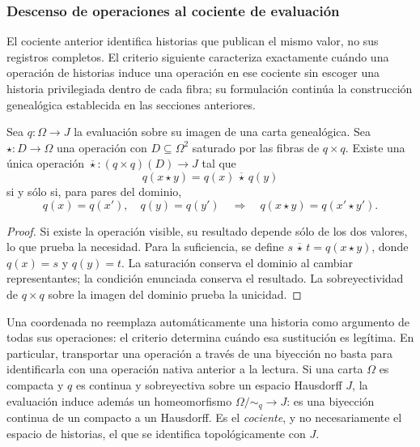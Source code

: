 \subsubsection{Descenso de operaciones al cociente de evaluación}
\label{sec:ch-descenso-fibras}

El cociente anterior identifica historias que publican el mismo valor, no
sus registros completos. El criterio siguiente caracteriza exactamente
cuándo una operación de historias induce una operación en ese cociente sin
escoger una historia privilegiada dentro de cada fibra; su formulación
continúa la construcción genealógica establecida en las secciones anteriores.

\begin{proposition}
\label{prop:ch-descenso-fibras}
Sea \(q:\Omega\to J\) la evaluación sobre su imagen de una carta
genealógica. Sea \(\star:D\to\Omega\) una operación con
\(D\subseteq\Omega^2\) saturado por las fibras de \(q\times q\).
Existe una única operación
\(\overline\star:(q\times q)(D)\to J\) tal que
\[
 q(x\star y)=q(x)\,\overline\star\,q(y)
\]
si y sólo si, para pares del dominio,
\[
 q(x)=q(x'),\quad q(y)=q(y')
 \quad\Longrightarrow\quad q(x\star y)=q(x'\star y').
\]
\end{proposition}

\begin{proof}
Si existe la operación visible, su resultado depende sólo de los dos
valores, lo que prueba la necesidad. Para la suficiencia, se define
\(s\,\overline\star\,t=q(x\star y)\), donde \(q(x)=s\) y
\(q(y)=t\). La saturación conserva el dominio al cambiar representantes;
la condición enunciada conserva el resultado. La sobreyectividad de
\(q\times q\) sobre la imagen del dominio prueba la unicidad.
\end{proof}

Una coordenada no reemplaza automáticamente una historia como argumento de
todas sus operaciones: el criterio determina cuándo esa sustitución es
legítima. En particular, transportar una operación a través de una biyección
no basta para identificarla con una operación nativa anterior a la lectura.
Si una carta \(\Omega\) es compacta y \(q\) es continua y sobreyectiva
sobre un espacio Hausdorff \(J\), la evaluación induce además un
homeomorfismo \(\Omega/{\sim_q}\to J\): es una biyección continua de un
compacto a un Hausdorff. Es el \emph{cociente}, y no necesariamente el
espacio de historias, el que se identifica topológicamente con \(J\).
